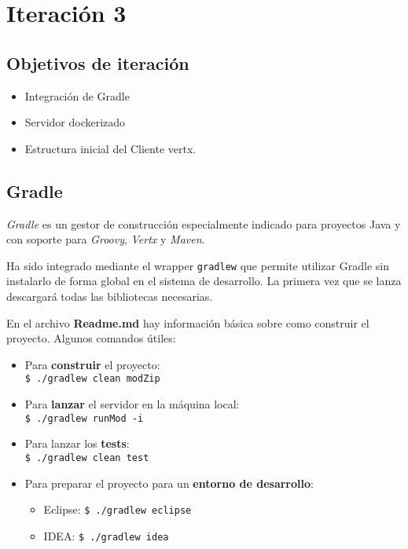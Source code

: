 \chapter{Iteración 3}
\section{Objetivos de iteración}
\begin{itemize}
  \item Integración de Gradle 
  \item Servidor dockerizado
  \item Estructura inicial del Cliente vertx.
\end{itemize}

\section{Gradle}
\emph{Gradle} es un gestor de construcción especialmente indicado para proyectos
Java y con soporte para \emph{Groovy}, \emph{Vertx} y \emph{Maven}.

Ha sido integrado mediante el wrapper \texttt{gradlew} que permite utilizar Gradle sin
instalarlo de forma global en el sistema de desarrollo. La primera vez que se
lanza descargará todas las bibliotecas necesarias.

En el archivo \textbf{Readme.md} hay información básica sobre como construir el
proyecto. Algunos comandos útiles:

\begin{itemize}
 \item Para \textbf{construir} el proyecto: \\
       \texttt{\$ ./gradlew clean modZip}
 \item Para \textbf{lanzar} el servidor en la máquina local: \\
       \texttt{\$ ./gradlew runMod -i}
 \item Para lanzar los \textbf{tests}: \\
       \texttt{\$ ./gradlew clean test}
 \item Para preparar el proyecto para un \textbf{entorno de desarrollo}:
    \begin{itemize}
      \item Eclipse: \texttt{\$ ./gradlew eclipse}
      \item IDEA: \texttt{\$ ./gradlew idea}
    \end{itemize}
\end{itemize}

